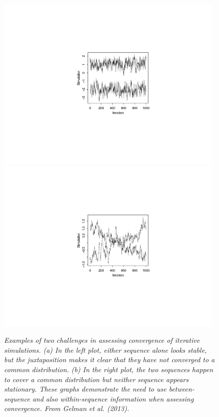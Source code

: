 \documentclass[american,]{article}
\begin{document}
\begin{figure}
\vspace{-.22\textwidth}
\centerline{\hspace{-.1\textwidth}
\includegraphics[width=0.98\textwidth]{graphics/convergechallenge1.pdf}
\hspace{-.5\textwidth}
\includegraphics[width=0.98\textwidth]{graphics/convergechallenge2.pdf}}
\vspace{-.22\textwidth}
\caption{\em Examples of two challenges in assessing convergence of iterative
simulations. (a) In the left plot, either sequence alone looks stable, but the
juxtaposition makes it clear that they have not converged to a common
distribution. (b) In the right plot, the two sequences happen to cover a common
distribution but neither sequence appears stationary. These graphs demonstrate
the need to use between-sequence and also within-sequence information when
assessing convergence. From Gelman et al. (2013).}
\label{converge.challenge}
\end{figure}
\end{document}
